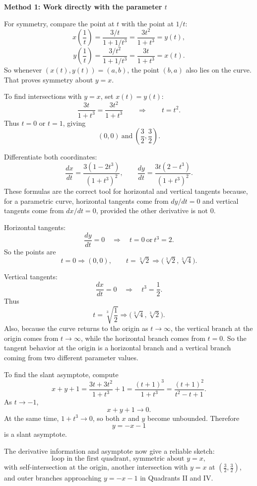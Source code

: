 \documentclass[a4paper,12pt,twocolumn]{article}
\newenvironment{solutionbox}{\begin{framed}}{\end{framed}}
\begin{document}
\begin{solutionbox}
\textbf{Method 1: Work directly with the parameter \(t\)}

\begin{steps}
\item For symmetry, compare the point at \(t\) with the point at \(1/t\):
\[
x\!\left(\frac1t\right)=\frac{3/t}{1+1/t^3}=\frac{3t^2}{1+t^3}=y(t),
\]
\[
y\!\left(\frac1t\right)=\frac{3/t^2}{1+1/t^3}=\frac{3t}{1+t^3}=x(t).
\]
So whenever \((x(t),y(t))=(a,b)\), the point \((b,a)\) also lies on the curve. That proves symmetry about \(y=x\).

To find intersections with \(y=x\), set \(x(t)=y(t)\):
\[
\frac{3t}{1+t^3}=\frac{3t^2}{1+t^3}
\qquad\Longrightarrow\qquad
t=t^2.
\]
Thus \(t=0\) or \(t=1\), giving
\[
\boxed{(0,0)\ \text{and}\ \left(\frac32,\frac32\right)}.
\]

\item Differentiate both coordinates:
\[
\frac{dx}{dt}=\frac{3(1-2t^3)}{(1+t^3)^2},
\qquad
\frac{dy}{dt}=\frac{3t(2-t^3)}{(1+t^3)^2}.
\]
These formulas are the correct tool for horizontal and vertical tangents because, for a parametric curve, horizontal tangents come from \(dy/dt=0\) and vertical tangents come from \(dx/dt=0\), provided the other derivative is not \(0\).

Horizontal tangents:
\[
\frac{dy}{dt}=0
\quad\Longrightarrow\quad
t=0 \ \text{or}\ t^3=2.
\]
So the points are
\[
t=0 \Longrightarrow (0,0),
\qquad
t=\sqrt[3]{2} \Longrightarrow \bigl(\sqrt[3]{2},\sqrt[3]{4}\bigr).
\]

Vertical tangents:
\[
\frac{dx}{dt}=0
\quad\Longrightarrow\quad
t^3=\frac12.
\]
Thus
\[
t=\sqrt[3]{\frac12}
\Longrightarrow
\bigl(\sqrt[3]{4},\sqrt[3]{2}\bigr).
\]
Also, because the curve returns to the origin as \(t\to\infty\), the vertical branch at the origin comes from \(t\to\infty\), while the horizontal branch comes from \(t=0\). So the tangent behavior at the origin is a horizontal branch and a vertical branch coming from two different parameter values.

\item To find the slant asymptote, compute
\[
x+y+1
=\frac{3t+3t^2}{1+t^3}+1
=\frac{(t+1)^3}{1+t^3}
=\frac{(t+1)^2}{t^2-t+1}.
\]
As \(t\to-1\),
\[
x+y+1\to0.
\]
At the same time, \(1+t^3\to0\), so both \(x\) and \(y\) become unbounded. Therefore
\[
\boxed{y=-x-1}
\]
is a slant asymptote.

\item The derivative information and asymptote now give a reliable sketch:
\[
\boxed{\text{loop in the first quadrant, symmetric about }y=x,}
\]
with self-intersection at the origin, another intersection with \(y=x\) at \(\left(\frac32,\frac32\right)\), and outer branches approaching \(y=-x-1\) in Quadrants II and IV.


\end{steps}
\end{solutionbox}
\end{document}
